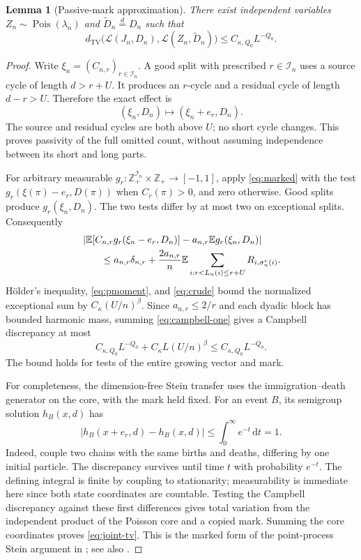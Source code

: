 \documentclass[11pt]{article}
\newcommand{\E}{\mathbb E}
\newcommand{\Pois}{\operatorname{Pois}}
\newcommand{\TV}{d_{\mathrm{TV}}}
\newcommand{\Law}{\mathcal L}
\newcommand{\dd}{\,\mathrm d}
\newtheorem{lemma}[theorem]{Lemma}
\theoremstyle{remark}
\begin{document}
\begin{lemma}[Passive-mark approximation]\label{lem:passive}
There exist independent variables $Z_n\sim\Pois(\lambda_n)$ and $\widetilde D_n\overset d=D_n$ such that
\begin{equation}\label{eq:joint-tv}
 \TV\bigl(\Law(J_n,D_n),\Law(Z_n,\widetilde D_n)\bigr)
 \le C_{\kappa,Q_0}L^{-Q_0}.
\end{equation}
\end{lemma}
\begin{proof}
Write $\xi_n=(C_{n,r})_{r\in\mathcal I_n}$. A good split with prescribed $r\in\mathcal I_n$ uses a source cycle of length $d>r+U$. It produces an $r$-cycle and a residual cycle of length $d-r>U$. Therefore the exact effect is
\[
 (\xi_n,D_n)\longmapsto(\xi_n+e_r,D_n).
\]
The source and residual cycles are both above $U$; no short cycle changes. This proves passivity of the full omitted count, without assuming independence between its short and long parts.

For arbitrary measurable $g_r:\mathbb Z_+^{\mathcal I_n}\times\mathbb Z_+\to[-1,1]$, apply \eqref{eq:marked} with the test $g_r(\xi(\pi)-e_r,D(\pi))$ when $C_r(\pi)>0$, and zero otherwise. Good splits produce $g_r(\xi_n,D_n)$. The two tests differ by at most two on exceptional splits. Consequently
\begin{align}
 &\left|\E[C_{n,r}g_r(\xi_n-e_r,D_n)]-a_{n,r}\E g_r(\xi_n,D_n)\right|\notag\\
 &\qquad\le a_{n,r}\delta_{n,r}
 +\frac{2a_{n,r}}n\E\sum_{i:r<L_n(i)\le r+U}R_{i,\sigma_n^r(i)}.
 \label{eq:campbell-one}
\end{align}
H\"older's inequality, \eqref{eq:pmoment}, and \eqref{eq:crude} bound the normalized exceptional sum by $C_\kappa(U/n)^\beta$. Since $a_{n,r}\le2/r$ and each dyadic block has bounded harmonic mass, summing \eqref{eq:campbell-one} gives a Campbell discrepancy at most
\[
 C_{\kappa,Q_0}L^{-Q_0}+C_\kappa L(U/n)^\beta
 \le C_{\kappa,Q_0}L^{-Q_0}.
\]
The bound holds for tests of the entire growing vector and mark.

For completeness, the dimension-free Stein transfer uses the immigration--death generator on the core, with the mark held fixed. For an event $B$, its semigroup solution $h_B(x,d)$ has
\[
 |h_B(x+e_r,d)-h_B(x,d)|\le\int_0^\infty e^{-t}\dd t=1.
\]
Indeed, couple two chains with the same births and deaths, differing by one initial particle. The discrepancy survives until time $t$ with probability $e^{-t}$. The defining integral is finite by coupling to stationarity; measurability is immediate here since both state coordinates are countable. Testing the Campbell discrepancy against these first differences gives total variation from the independent product of the Poisson core and a copied mark. Summing the core coordinates proves \eqref{eq:joint-tv}. This is the marked form of the point-process Stein argument in \cite{BB}; see also \cite[\texttt{lem:passive-Stein}]{OrderQuant}.
\end{proof}
\end{document}
